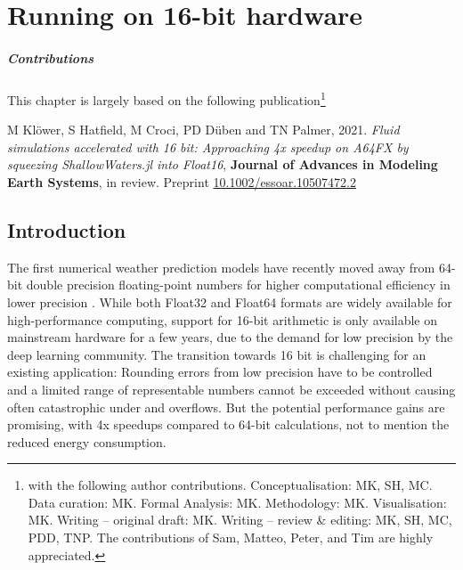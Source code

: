 \chapter{Running on 16-bit hardware}
\label{chap:hardware}

{\small
\paragraph{Contributions} This chapter is largely based on the following publication\footnote{with the following author contributions.
Conceptualisation: MK, SH, MC. Data curation: MK. Formal Analysis: MK. Methodology: MK. Visualisation: MK. Writing – original draft:
MK. Writing – review \& editing: MK, SH, MC, PDD, TNP. The contributions of Sam, Matteo, Peter, and Tim are highly appreciated.}

\vspace{\baselineskip}
\indent M Klöwer, S Hatfield, M Croci, PD Düben and TN Palmer, 2021. \emph{Fluid simulations accelerated with 16 bit:
Approaching 4x speedup on A64FX by squeezing ShallowWaters.jl into Float16}, \textbf{Journal of Advances in Modeling
Earth Systems}, in review. Preprint \href{https://doi.org/10.1002/essoar.10507472.2}{10.1002/essoar.10507472.2}
\vspace{\baselineskip}}

\section{Introduction}

The first numerical weather prediction models have recently moved away from 64-bit double precision floating-point numbers
for higher computational efficiency in lower precision \citep{Govett2017,Nakano2018,Rudisuhli2013,Vana2017}. While both Float32
and Float64 formats are widely available for high-performance computing, support for 16-bit arithmetic is only available on mainstream
hardware for a few years, due to the demand for low precision by the deep learning community. The transition towards 16 bit is challenging
for an existing application: Rounding errors from low precision have to be controlled and a limited range of representable numbers
cannot be exceeded without causing often catastrophic under and overflows. But the potential performance gains are promising,
with 4x speedups compared to 64-bit calculations, not to mention the reduced energy consumption.

